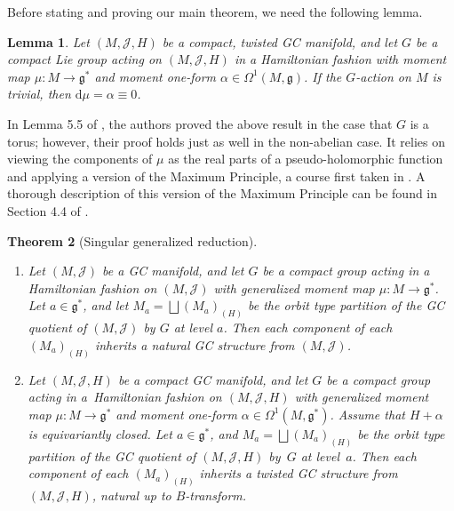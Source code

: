 \documentclass[11pt]{article}
\newtheorem{Theorem}{Theorem}[section]
\newtheorem{Lemma}[Theorem]{Lemma}
\numberwithin{equation}{section}
\newcommand{\func}[3]{#1 \colon #2 \to #3}
\newcommand{\litlet}{\renewcommand{\labelenumi}{(\alph{enumi})}}
\begin{document}
Before stating and proving our main theorem, we need the following lemma.


\begin{Lemma} \label{lem1}
Let $(M,\mathcal{J},H)$ be a \emph{compact}, twisted GC manifold, and let $G$ be a compact Lie group acting on $(M,\mathcal{J},H)$ in a Hamiltonian fashion with moment map $\func{\mu}{M}{\mathfrak{g}^*}$ and moment one-form $\alpha \in \Omega^1(M,\mathfrak{g})$.
If the $G$-action on $M$ is trivial, then $\mathrm{d} \mu = \alpha \equiv 0$.
\end{Lemma}


In Lemma 5.5 of \cite{linbaird}, the authors proved the above result in the case that $G$ is a torus;  however, their proof holds just as well in the non-abelian case.  It relies on viewing the components of $\mu$ as the real parts of a pseudo-holomorphic function and applying a version of the Maximum Principle, a course f\/irst taken in \cite{nitta}.  A thorough description of this version of the Maximum Principle can be found in Section 4.4 of \cite{MyThesis}.

\begin{Theorem}[Singular generalized reduction] \label{MainThm} \qquad
\begin{enumerate} \itemsep=0pt\litlet
  \item Let $(M,\mathcal{J})$ be a GC manifold, and let $G$ be a compact group acting in a Hamiltonian fashion on $(M,\mathcal{J})$ with generalized moment map $\func{\mu}{M}{\mathfrak{g}^*}$.  Let $a \in \mathfrak{g}^*$, and let $M_a = \bigsqcup (M_{a})_{(H)}$ be the orbit type partition of the GC quotient of $(M,\mathcal{J})$ by $G$ at level $a$.
  Then each component of each $\left( M_{a} \right)_{(H)}$ inherits a natural GC structure from $(M,\mathcal{J})$.

  \item Let $(M,\mathcal{J},H)$ be a \emph{compact} GC manifold, and let $G$ be a compact group acting in a~Hamiltonian fashion on $(M,\mathcal{J},H)$ with generalized moment map $\func{\mu}{M}{\mathfrak{g}^*}$ and moment one-form $\alpha \in \Omega^1(M,\mathfrak{g}^*)$.  Assume that $H+\alpha$ is equivariantly closed.
Let $a \in \mathfrak{g}^*$, and $M_a = \bigsqcup (M_{a})_{(H)}$ be the orbit type partition of the GC quotient of $(M,\mathcal{J},H)$ by~$G$ at level~$a$.
  Then each component of each $\left( M_{a} \right)_{(H)}$ inherits a twisted GC structure from $(M,\mathcal{J},H)$, natural up to $B$-transform.
\end{enumerate}
\end{Theorem}
\end{document}
